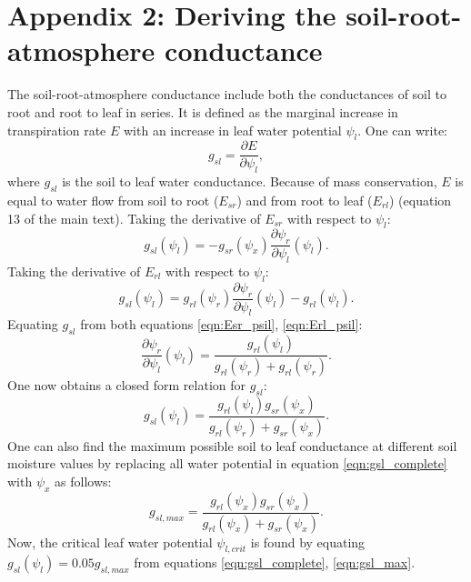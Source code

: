 \documentclass[utf8]{frontiers_suppmat} %
\begin{document}
\section*{Appendix 2: Deriving the soil-root-atmosphere conductance}

The soil-root-atmosphere conductance include both the conductances of soil to root and root to leaf in series. It is defined as the marginal increase in transpiration rate $E$ with an increase in leaf water potential $\psi_l$. One can write:
\begin{equation}
    \label{eqn:g_sl}
    g_{sl} = \frac{\partial E}{\partial \psi_l},
\end{equation}
where $g_{sl}$ is the soil to leaf water conductance. Because of mass conservation, $E$ is equal to water flow from soil to root ($E_{sr}$) and from root to leaf ($E_{rl}$) (equation 13 of the main text).
Taking the derivative of $E_{sr}$ with respect to $\psi_l$:
\begin{equation}
    \label{eqn:Esr_psil}
    g_{sl} (\psi_l) = - g_{sr} (\psi_x) \frac{\partial \psi_r}{\partial \psi_l} (\psi_l).
\end{equation}
Taking the derivative of $E_{rl}$ with respect to $\psi_l$:
\begin{equation}
    \label{eqn:Erl_psil}
    g_{sl} (\psi_l) = g_{rl} (\psi_r) \frac{\partial \psi_r}{\partial \psi_l} (\psi_l) - g_{rl} (\psi_l).
\end{equation}
Equating $g_{sl}$ from both equations \ref{eqn:Esr_psil}, \ref{eqn:Erl_psil}:
\begin{equation}
    \label{eqn:psir_psil}
    \frac{\partial \psi_r}{\partial \psi_l} (\psi_l) = \frac{g_{rl} (\psi_l)}{g_{rl} (\psi_r) + g_{rl} (\psi_r)}.
\end{equation}
One now obtains a closed form relation for $g_{sl}$:
\begin{equation}
    \label{eqn:gsl_complete}
    g_{sl} (\psi_l) = \frac{g_{rl} (\psi_l) g_{sr} (\psi_x)}{g_{rl} (\psi_r) + g_{sr} (\psi_x)}.
\end{equation}
One can also find the maximum possible soil to leaf conductance at different soil moisture values by replacing all water potential in equation \ref{eqn:gsl_complete} with $\psi_x$ as follows:
\begin{equation}
    \label{eqn:gsl_max}
    g_{sl,max} = \frac{g_{rl} (\psi_x) g_{sr} (\psi_x)}{g_{rl} (\psi_x) + g_{sr} (\psi_x)}.
\end{equation}
Now, the critical leaf water potential $\psi_{l,crit}$ is found by equating $g_{sl}(\psi_l) = 0.05 g_{sl,max}$ from equations \ref{eqn:gsl_complete}, \ref{eqn:gsl_max}.
\end{document}
